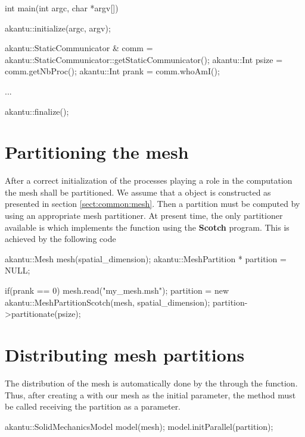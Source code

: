 \begin{cpp}
int main(int argc, char *argv[])
{
  akantu::initialize(argc, argv);

  akantu::StaticCommunicator & comm =
  akantu::StaticCommunicator::getStaticCommunicator();
  akantu::Int psize = comm.getNbProc();
  akantu::Int prank = comm.whoAmI();

  ...

  akantu::finalize();
}
\end{cpp}

\section{Partitioning the mesh}

After a correct initialization of the processes playing a role in the
computation the mesh shall be partitioned. We assume that a  object
is constructed as presented in section \ref{sect:common:mesh}.  Then a partition
must be computed by using an appropriate mesh partitioner. At present time, the
only partitioner available is  which implements the
function  using the \textbf{Scotch}\cite{scotch} program.
This is achieved by the following code

\begin{cpp}
  akantu::Mesh mesh(spatial_dimension);
  akantu::MeshPartition * partition = NULL;

  if(prank == 0) {
    mesh.read("my_mesh.msh");
    partition = new akantu::MeshPartitionScotch(mesh, spatial_dimension);
    partition->partitionate(psize);
  }
\end{cpp}


\section{Distributing mesh partitions}

The distribution of the mesh is automatically done by the
 through the  function.  Thus,
after creating a  with our mesh as the initial
parameter, the  method must be called receiving the partition
as a parameter.

\begin{cpp}
  akantu::SolidMechanicsModel model(mesh);
  model.initParallel(partition);
\end{cpp}

